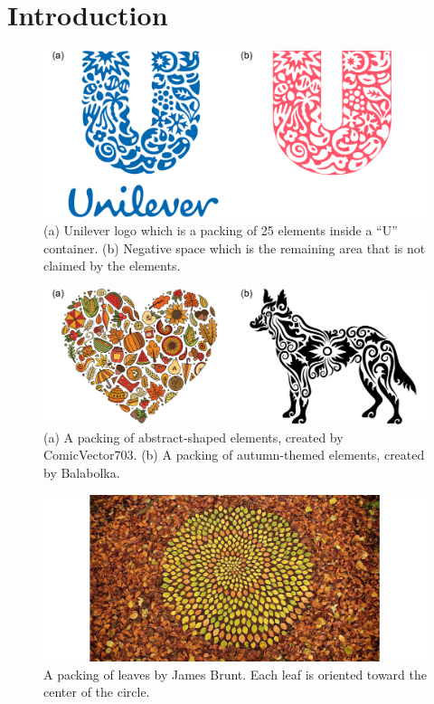
\chapter{Introduction}
\label{chapter_introduction}

\begin{figure}
\centering
\includegraphics[width=1.0\textwidth]{figures/intro/unilever_w_neg_space.pdf} 
\caption[Unilever logo]
{\label{fig_logo_packing} 
(a) Unilever logo which is a packing of 25 elements inside a ``U'' container. 
(b) Negative space which is the remaining area that is not claimed by the elements. }
\end{figure}

\begin{figure}
\centering
\includegraphics[width=1.0\textwidth]{figures/intro/balabolka_dog_flow.pdf} 
\caption[Packings in graphic design]
{\label{fig_graphic_designs} 
(a) A packing of abstract-shaped elements, created by ComicVector703.
(b) A packing of autumn-themed elements, created by Balabolka.  }
\end{figure}

\begin{figure}
\centering
\includegraphics[width=1.0\textwidth]{figures/intro/woodland.jpg} 
\caption[Packing in art]
{\label{fig_woodland} 
A packing of leaves by James Brunt. Each leaf is oriented toward the center of the circle. }
\end{figure}


